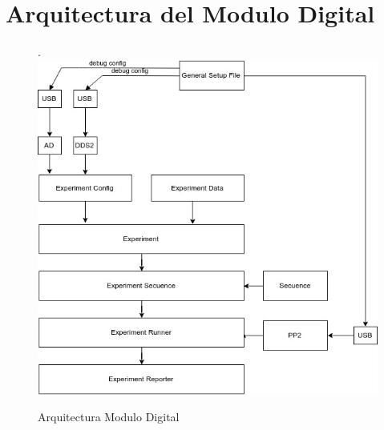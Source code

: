 \section{Arquitectura del Modulo Digital}
\begin{figure}[!htb].
    \includegraphics[width=\linewidth]{../figures/d19.jpg}
    \caption{Arquitectura Modulo Digital}
    \label{fig:d19}
\end{figure}
\newpage
